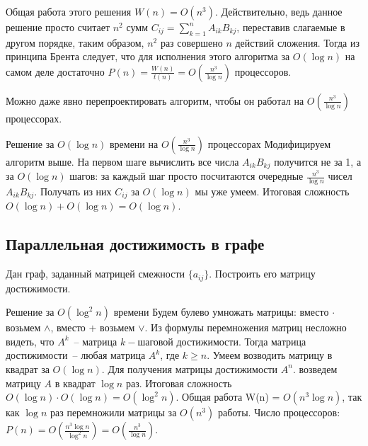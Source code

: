 Общая работа этого решения $W(n) = O(n^3)$. Действительно, ведь данное решение просто считает $n^2$ сумм $C_{ij} = \sum_{k=1}^n A_{ik}B_{kj}$, переставив слагаемые в другом порядке, таким образом, $n^2$ раз совершено $n$ действий сложения. Тогда из принципа Брента следует, что для исполнения этого алгоритма за $O(\log n)$ на самом деле достаточно $P(n) = \frac{W(n)}{t(n)} = O\left(\frac{n^3}{\log n}\right)$ процессоров. 

Можно даже явно перепроектировать алгоритм, чтобы он работал на $O\left(\frac{n^3}{\log n}\right)$ процессорах.

\begin{algodescription}{Решение за $O(\log n)$ времени на $O\left(\frac{n^3}{\log n}\right)$ процессорах} Модифицируем алгоритм выше. На первом шаге вычислить все числа $A_{ik}B_{kj}$ получится не за 1, а за $O(\log n)$ шагов: за каждый шаг просто посчитаются очередные $\frac{n^3}{\log n}$ чисел $A_{ik}B_{kj}$. Получать из них $C_{ij}$ за $O(\log n)$ мы уже умеем. Итоговая сложность $O(\log n) + O(\log n) = O(\log n)$. 
\end{algodescription}

\subsection{Параллельная достижимость в графе}
\begin{problem*}
	Дан граф, заданный матрицей смежности $\{a_{ij}\}$. Построить его матрицу достижимости.
\end{problem*}

\begin{algodescription}{Решение за $O(\log^2 n)$ времени} Будем булево умножать матрицы: вместо $\cdot$ возьмем $\land$, вместо $+$ возьмем $\lor$. Из формулы перемножения матриц несложно видеть, что $A^k$~-- матрица $k-$шаговой достижимости. Тогда матрица достижимости~-- любая матрица $A^k$, где $k\geq n$. Умеем возводить матрицу в квадрат за $O(\log n)$. Для получения матрицы достижимости $A^n$. возведем матрицу $A$ в квадрат $\log n$ раз. Итоговая сложность $O(\log n) \cdot O(\log n) = O(\log^2 n)$. Общая работа W(n) = $O(n^3\log n)$, так как $\log n$ раз перемножили матрицы за $O(n^3)$ работы. Число процессоров: $P(n) = O\left(\frac{n^3\log n}{\log^2 n}\right) = O\left(\frac{n^3}{\log n}\right)$.
\end{algodescription}
